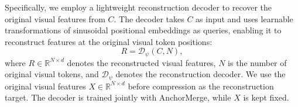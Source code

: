 Specifically, we employ a lightweight reconstruction decoder to recover the original visual features from $C$. The decoder takes $C$ as input and uses learnable transformations of sinusoidal positional embeddings as queries, enabling it to reconstruct features at the original visual token positions:
\begin{equation}
R=\mathcal{D}_{\psi}(C,N),
\label{eq:recon}
\end{equation}
where $R\in\mathbb{R}^{N\times d}$ denotes the reconstructed visual features, $N$ is the number of original visual tokens, and $\mathcal{D}_{\psi}$ denotes the reconstruction decoder. We use the original visual features $X\in\mathbb{R}^{N\times d}$ before compression as the reconstruction target. The decoder is trained jointly with AnchorMerge, while $X$ is kept fixed.
